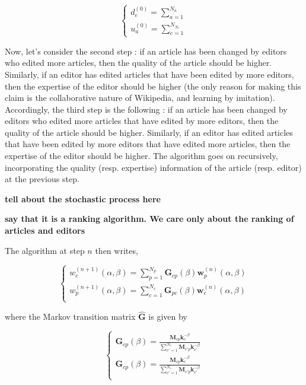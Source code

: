\begin{equation}
\begin{cases}
 d_{e}^{(0)} = \sum_{a=1}^{N_{a}}\\
 u_{a}^{(0)} = \sum_{e=1}^{N_{N_{e}}}
\end{cases}
\end{equation}

Now, let's consider the second step :  if an article has been changed by editors who edited more articles, then the quality of the article should be higher. Similarly, if an editor has edited articles that have been edited by more editors, then the expertise of the editor should be higher (the only reason for making this claim is the collaborative nature of Wikipedia, and learning by imitation). Accordingly, the third step is the following : if an article has been changed by editors who edited more articles that have edited by more editors, then the quality of the article should be higher. Similarly, if an editor has edited articles that have been edited by more editors that have edited more articles, then the expertise of the editor should be higher. The algorithm goes on recursively, incorporating the quality (resp. expertise) information of the article (resp. editor) at the previous step. 

{\bf tell about the stochastic process here} \cite{caldarelli2012network}

{\bf say that it is a ranking algorithm. We care only about the ranking of articles and editors}

The algorithm at step $n$ then writes,

\begin{equation}
\begin{cases}
 w^{(n+1)}_c (\alpha,\beta) = \sum_{p=1}^{N_p}  \mathbf{G}_{cp}(\beta) \mathbf{w}^{(n)}_p (\alpha,\beta)\\
w^{(n+1)}_p (\alpha,\beta) = \sum_{c=1}^{N_c}  \mathbf{G}_{pc}(\beta) \mathbf{w}^{(n)}_c (\alpha,\beta)\\
\end{cases}
\end{equation}

where the Markov transition matrix $\mathbf{\hat{G}}$ is given by 

\begin{equation}
\begin{cases}
\mathbf{G}_{cp}(\beta) = \frac{\mathbf{M}_{cp} \mathbf{k}_{c}^{-\beta}}{\sum_{c' = 1}^{N_c} \mathbf{M}_{c'p} \mathbf{k}_{c'}^{-\beta}}\\
\mathbf{G}_{cp}(\beta) = \frac{\mathbf{M}_{cp} \mathbf{k}_{c}^{-\beta}}{\sum_{c' = 1}^{N_c} \mathbf{M}_{c'p} \mathbf{k}_{c'}^{-\beta}}\\
 \end{cases}
\end{equation}

